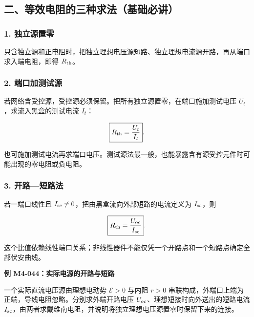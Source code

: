 \subsection{二、等效电阻的三种求法（基础必讲）}\label{m4:ux4e8cux7b49ux6548ux7535ux963bux7684ux4e09ux79cdux6c42ux6cd5ux57faux7840ux5fc5ux8bb2}

\subsubsection{1. 独立源置零}\label{m4:ux72ecux7acbux6e90ux7f6eux96f6}

只含独立源和正电阻时，把独立理想电压源短路、独立理想电流源开路，再从端口求入端电阻，即得
\(R_{\rm th}\)。

\subsubsection{2.
端口加测试源}\label{m4:ux7aefux53e3ux52a0ux6d4bux8bd5ux6e90}

若网络含受控源，受控源必须保留。把所有独立源置零，在端口施加测试电压
\(U_t\)，求流入黑盒的测试电流 \(I_t\)：

\[
\boxed{R_{\rm th}=\frac{U_t}{I_t}}.
\]

也可施加测试电流再求端口电压。测试源法最一般，也能暴露含有源受控元件时可能出现的零电阻或负电阻。

\subsubsection{3. 开路---短路法}\label{m4:ux5f00ux8defux77edux8defux6cd5}

若一端口线性且 \(I_{\rm sc}\ne0\)，把由黑盒流向外部短路的电流定义为
\(I_{\rm sc}\)，则

\[
\boxed{R_{\rm th}=\frac{U_{\rm oc}}{I_{\rm sc}}}.
\]

这个比值依赖线性端口关系；非线性器件不能仅凭一个开路点和一个短路点确定全部伏安曲线。

\par{}
\noindent\begin{minipage}{\linewidth}

\textbf{例 M4-044：实际电源的开路与短路}

一个实际直流电压源由理想电动势 \(\mathcal E>0\) 与内阻 \(r>0\)
串联构成，外端口上端为正端，导线电阻忽略。分别求外端开路电压
\(U_{\rm oc}\)、理想短接时向外送出的短路电流
\(I_{\rm sc}\)，由两者求戴维南电阻，并说明将独立理想电压源置零时保留下来的连接。

\end{minipage}\par

